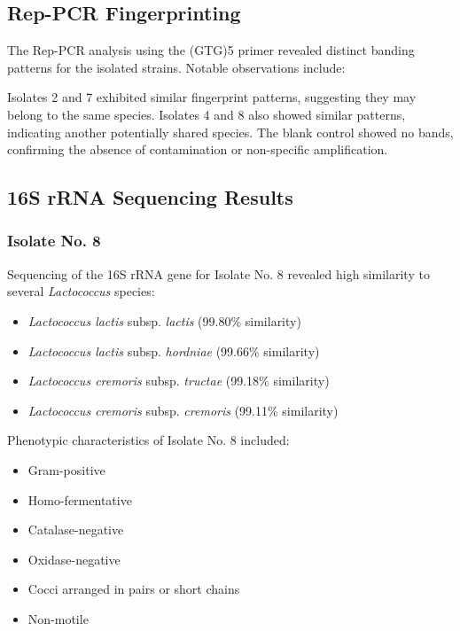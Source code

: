 \subsection{Rep-PCR Fingerprinting}
The Rep-PCR analysis using the (GTG)5 primer revealed distinct banding patterns for the isolated strains. Notable observations include:

Isolates 2 and 7 exhibited similar fingerprint patterns, suggesting they may belong to the same species.
Isolates 4 and 8 also showed similar patterns, indicating another potentially shared species.
The blank control showed no bands, confirming the absence of contamination or non-specific amplification.

\subsection{16S rRNA Sequencing Results}
\subsubsection{Isolate No. 8}
Sequencing of the 16S rRNA gene for Isolate No. 8 revealed high similarity to several \textit{Lactococcus} species:

\begin{itemize}
    \item \textit{Lactococcus lactis} subsp. \textit{lactis} (99.80\% similarity)
    \item \textit{Lactococcus lactis} subsp. \textit{hordniae} (99.66\% similarity)
    \item \textit{Lactococcus cremoris} subsp. \textit{tructae} (99.18\% similarity)
    \item \textit{Lactococcus cremoris} subsp. \textit{cremoris} (99.11\% similarity)
\end{itemize}

\vspace{0.5em}
Phenotypic characteristics of Isolate No. 8 included:

\begin{itemize}
    \item Gram-positive
    \item Homo-fermentative
    \item Catalase-negative
    \item Oxidase-negative
    \item Cocci arranged in pairs or short chains
    \item Non-motile
\end{itemize}

